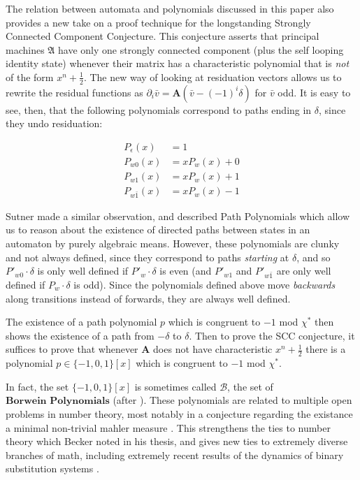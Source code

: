 \documentclass{article}
\renewcommand{\P}{\mathfrak{A}}
\newcommand{\2}{\textbf{2}}
\newcommand{\Am}{\textbf{A}}
\newcommand{\del}{\partial}
\newcommand{\vv}{\bar{v}}
\theoremstyle{definition}
\begin{document}
The relation between automata and polynomials discussed in this paper 
also provides a new take on a proof technique for the longstanding
Strongly Connected Component Conjecture. This conjecture 
asserts that principal machines $\P$ have only one strongly connected component 
(plus the self looping identity state) whenever their matrix has a 
characteristic polynomial that is \emph{not} of the form $x^n + \frac{1}{2}$.
The new way of looking at residuation vectors allows us to rewrite the 
residual functions as $\del_i \vv = \Am (\vv - (-1)^i \delta)$ for $\vv$ odd.
It is easy to see, then, that the following polynomials correspond to paths
ending in $\delta$, since they undo residuation:

\begin{align*}
  P_\epsilon(x)   &= 1\\
  P_{w0}(x)       &= xP_w(x) + 0\\
  P_{w1}(x)       &= xP_w(x) + 1\\
  P_{w\bar{1}}(x) &= xP_w(x) - 1
\end{align*}

Sutner made a similar observation, and described Path Polynomials 
\cite{Sutner18:abelian_automata} which
allow us to reason about the existence of directed paths between states 
in an automaton by purely algebraic means. However, these polynomials are
clunky and not always defined, since they correspond to paths
\emph{starting} at $\delta$, and so $P'_{w0} \cdot \delta$ is only well 
defined if $P'_w \cdot \delta$ is even (and $P'_{w1}$ and $P'_{w\bar{1}}$ 
are only well defined if $P_w \cdot \delta$ is odd). Since the polynomials 
defined above move \emph{backwards} along transitions instead of forwards, 
they are always well defined.

The existence of a path polynomial $p$ which is congruent to $-1$ mod $\chi^*$
then shows the existence of a path from $-\delta$ to $\delta$.
Then to prove the SCC conjecture, it suffices to prove that whenever $\Am$ 
does not have characteristic $x^n + \frac{1}{2}$ there is a polynomial 
$p \in \{-1,0,1\}[x]$ which is congruent to $-1$ mod $\chi^*$. 

In fact, the set $\{-1,0,1\}[x]$ is sometimes called $\mathcal{B}$, the
set of $\textbf{Borwein Polynomials}$ 
(after \cite{Borwein97:restricted-coefficients}). 
These polynomials are related to multiple open problems in number theory, 
most notably in a conjecture regarding the existance a minimal non-trivial 
mahler measure \cite{Mossinghoff:thesis}. This strengthens the ties to 
number theory which Becker noted in his thesis, and gives new ties to 
extremely diverse branches of math, including extremely recent results of 
the dynamics of binary substitution systems \cite{Baake17:substitutions}.
\end{document}
